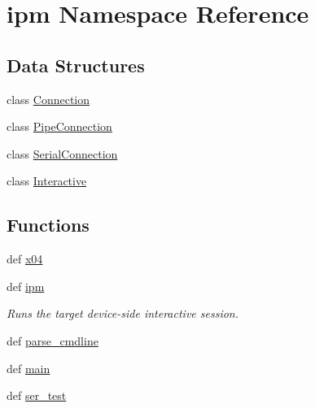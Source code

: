 \hypertarget{namespaceipm}{\section{ipm Namespace Reference}
\label{namespaceipm}
}
\subsection*{Data Structures}
\begin{DoxyCompactItemize}
\item 
class \hyperlink{classipm_1_1_connection}{Connection}
\item 
class \hyperlink{classipm_1_1_pipe_connection}{Pipe\-Connection}
\item 
class \hyperlink{classipm_1_1_serial_connection}{Serial\-Connection}
\item 
class \hyperlink{classipm_1_1_interactive}{Interactive}
\end{DoxyCompactItemize}
\subsection*{Functions}
\begin{DoxyCompactItemize}
\item 
def \hyperlink{namespaceipm_a168aaf0dec95512a558953af284badb2}{x04}
\item 
def \hyperlink{namespaceipm_ae312f51bfee0555506fe4b10122c6310}{ipm}
\begin{DoxyCompactList}\small\item\em Runs the target device-\/side interactive session. \end{DoxyCompactList}\item 
def \hyperlink{namespaceipm_a7d15b0e660c597527afdd183b01f70b3}{parse\-\_\-cmdline}
\item 
def \hyperlink{namespaceipm_a8224e31790c17d17c8dfc69593c4140e}{main}
\item 
def \hyperlink{namespaceipm_a804b46a1a54b54f88903b52ee9c8aeba}{ser\-\_\-test}
\end{DoxyCompactItemize}
